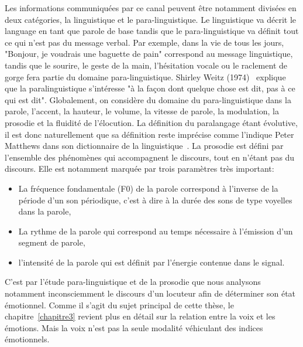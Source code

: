 Les informations communiquées par ce canal peuvent être notamment divisées en deux catégories, la linguistique et le para-linguistique.
Le linguistique va décrit le language en tant que parole de base tandis que le para-linguistique va définit tout ce qui n'est pas du message verbal. Par exemple, dans la vie de tous les jours, "Bonjour, je voudrais une baguette de pain" correspond au message linguistique, tandis que le sourire, le geste de la main, l'hésitation vocale ou le raclement de gorge fera partie du domaine para-linguistique.
Shirley Weitz (1974)~\cite{Weitz1974} explique que la paralinguistique s'intéresse "à la façon dont quelque chose est dit, pas à ce qui est dit". Globalement, on considère du domaine du para-linguistique dans la parole, l'accent, la hauteur, le volume, la vitesse de parole, la modulation, la prosodie et la fluidité de l'élocution.
La définition du paralangage étant évolutive, il est donc naturellement que sa définition reste imprécise comme l'indique Peter Matthews dans son dictionnaire de la linguistique~\cite{Matthews2014}.
La prosodie est défini par l'ensemble des phénomènes qui accompagnent le discours, tout en n'étant pas du discours. Elle est notamment marquée par trois paramètres très important:
\begin{itemize}
  \item La fréquence fondamentale (F0) de la parole correspond à l'inverse de la période d'un son périodique, c'est à dire à la durée des sons de type voyelles dans la parole,
  \item La rythme de la parole qui correspond au temps nécessaire à l'émission d'un segment de parole,
  \item l'intensité de la parole qui est définit par l'énergie contenue dans le signal.
\end{itemize}
C'est par l'étude para-linguistique et de la prosodie que nous analysons notamment inconsciemment le discours d'un locuteur afin de déterminer son état émotionnel. Comme il s'agit du sujet principal de cette thèse, le chapitre~\ref{chapitre3} revient plus en détail sur la relation entre la voix et les émotions. Mais la voix n'est pas la seule modalité véhiculant des indices émotionnels.

